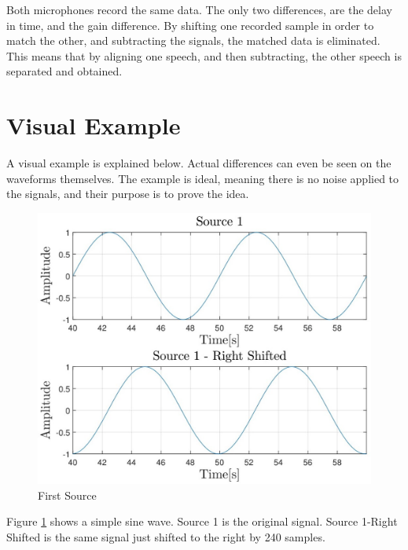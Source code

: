 
Both microphones record the same data. The only two differences, are the delay in time,
and the gain difference. By shifting one recorded sample in order to match the other,
and subtracting the signals, the matched data is eliminated. This means that by aligning 
one speech, and then subtracting, the other speech is separated and obtained.

\newpage

\section{Visual Example}
A visual example is explained below. Actual differences can even be seen on the waveforms themselves.
The example is ideal, meaning there is no noise applied to the signals, and their purpose is to 
prove the idea.

\begin{figure}[htp]
	\centering
	\includegraphics[width=\textwidth]{Illustrations/source1.jpg}
	\caption{First Source}
	\label{fig:source1}
\end{figure}

Figure \ref{fig:source1} shows a simple sine wave. Source 1 is the original signal. Source 1-Right Shifted
is the same signal just shifted to the right by 240 samples.

\newpage

